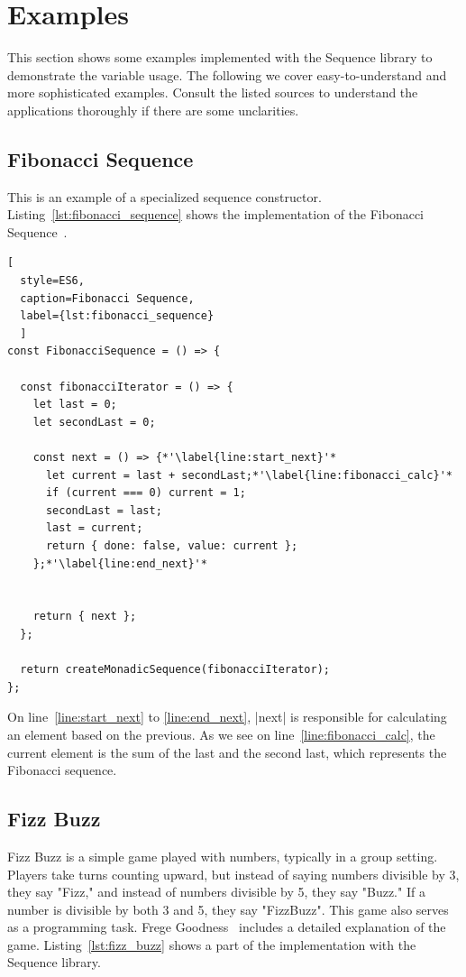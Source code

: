 \section{Examples} %
\label{sec:Examples}
This section shows some examples implemented with the
Sequence library to demonstrate the variable usage.
The following we cover easy-to-understand and more sophisticated
examples.  Consult the listed sources to understand the applications
thoroughly if there are some unclarities.

\subsection{Fibonacci Sequence}
\label{sub:Fibonacci Sequence}
This is an example of a specialized sequence constructor.
Listing~\ref{lst:fibonacci_sequence} shows the implementation of the Fibonacci 
Sequence~\cite[p.~36]{math_diskrete_2011}. 
\begin{lstlisting}[
  style=ES6, 
  caption=Fibonacci Sequence,
  label={lst:fibonacci_sequence}
  ]
const FibonacciSequence = () => {

  const fibonacciIterator = () => {
    let last = 0;
    let secondLast = 0;

    const next = () => {*'\label{line:start_next}'*
      let current = last + secondLast;*'\label{line:fibonacci_calc}'*
      if (current === 0) current = 1;
      secondLast = last;
      last = current;
      return { done: false, value: current };
    };*'\label{line:end_next}'*


    return { next };
  };

  return createMonadicSequence(fibonacciIterator);
};
\end{lstlisting}
On line~\ref{line:start_next} to \ref{line:end_next}, |next| is responsible for calculating an
element based on the previous. As we see on line~\ref{line:fibonacci_calc}, the current element is the
sum of the last and the second last, which represents the Fibonacci sequence.

\subsection{Fizz Buzz}
\label{sub:Fizz Buzz}
Fizz Buzz is a simple game played with numbers, typically in a group setting. Players
take turns counting upward, but instead of saying numbers divisible by 3, they
say "Fizz," and instead of numbers divisible by 5, they say "Buzz." If a number
is divisible by both 3 and 5, they say "FizzBuzz". This game also serves as a 
programming task.
\newline
Frege Goodness~\cite{frege_goodness} includes a detailed explanation of the
game. Listing~\ref{lst:fizz_buzz} shows a part of the implementation with the
Sequence library.


